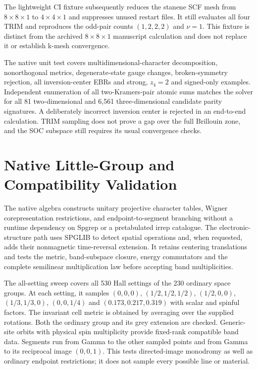 \documentclass[11pt]{article}
\begin{document}
The lightweight CI fixture subsequently reduces the stanene SCF mesh
from $8\times8\times1$ to $4\times4\times1$ and suppresses unused restart
files. It still evaluates all four TRIM and reproduces the odd-pair
counts $(1,2,2,2)$ and $\nu=1$. This fixture is distinct from the
archived $8\times8\times1$ manuscript calculation and does not replace
it or establish k-mesh convergence.

The native unit test covers multidimensional-character decomposition,
nonorthogonal metrics, degenerate-state gauge changes, broken-symmetry
rejection, all inversion-center EBRs and strong, $z_4=2$ and signed-only
examples. Independent enumeration of all two-Kramers-pair atomic sums
matches the solver for all 81 two-dimensional and 6,561 three-dimensional
candidate parity signatures. A deliberately incorrect inversion center
is rejected in an end-to-end calculation. TRIM sampling does not prove
a gap over the full Brillouin zone, and the SOC subspace still requires
its usual convergence checks.


\section{Native Little-Group and Compatibility Validation}
\label{sec:si-little-groups}
The native algebra constructs unitary projective character tables,
Wigner corepresentation restrictions, and endpoint-to-segment
branching without a runtime dependency on Spgrep or a pretabulated
irrep catalogue. The electronic-structure path uses SPGLIB to detect
spatial operations and, when requested, adds their nonmagnetic
time-reversal extension. It retains centering translations and tests
the metric, band-subspace closure, energy commutators and the complete
semilinear multiplication law before accepting band multiplicities.

The all-setting sweep covers all 530 Hall settings of the 230 ordinary
space groups. At each setting, it samples
$(0,0,0)$, $(1/2,1/2,1/2)$, $(1/2,0,0)$, $(1/3,1/3,0)$,
$(0,0,1/4)$ and $(0.173,0.217,0.319)$ with scalar and spinful factors.
The invariant cell metric is obtained by averaging over the supplied
rotations. Both the ordinary group and its grey extension are checked.
Generic-site orbits with physical spin multiplicity provide fixed-rank
compatible band data. Segments run from Gamma to the other sampled
points and from Gamma to its reciprocal image $(0,0,1)$.
This tests directed-image monodromy as well as ordinary endpoint
restrictions; it does not sample every possible line or material.
\end{document}
